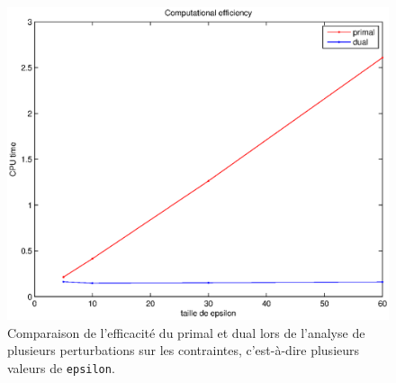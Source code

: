 \begin{figure}
  \begin{center}
    \includegraphics[scale=0.6]{img/efficiencyDual.eps}
    \caption{Comparaison de l'efficacité du primal et dual lors de
    l'analyse de plusieurs perturbations sur les contraintes, c'est-à-dire plusieurs valeurs de \texttt{epsilon}.}
    \label{fig:efficiencyDual}
  \end{center}
\end{figure}
